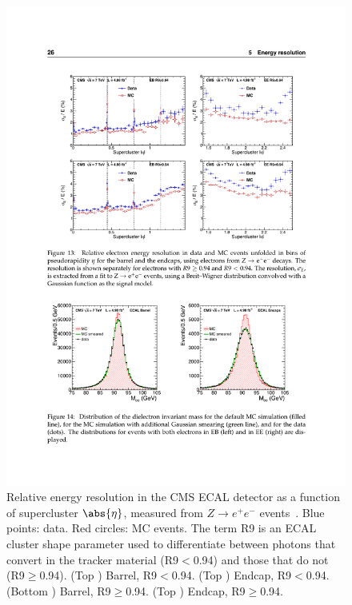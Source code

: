 \begin{figure}[hbtp]
  \begin{center}
    \includegraphics[width=2.0\cmsFigWidth]{figures/cms-ecal-performance}
    \caption{Relative energy resolution in the CMS ECAL detector as a function of supercluster $\abs{\eta}$, measured from $Z\rightarrow$$e^{+}e^{-}$ events~\cite{Chatrchyan:2013dga}. Blue points: data. Red circles: MC events. The term R9 is an ECAL cluster shape parameter used to differentiate between photons that convert in the tracker material (R9$<$0.94) and those that do not (R9$\ge$0.94). (Top \cmsLeft) Barrel, R9$<$0.94. (Top \cmsRight) Endcap, R9$<$0.94. (Bottom \cmsLeft) Barrel, R9$\ge$0.94. (Top \cmsRight) Endcap, R9$\ge$0.94.}
    \label{fig:cms-ecal-performance}
  \end{center}
\end{figure}

